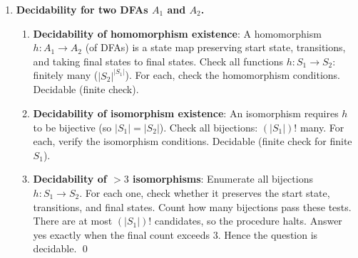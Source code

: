 \begin{enumerate}[{12.}1. ]
\begin{enumerate}
\item \textbf{Exists accepted string with all paths leading to final states}:
This asks whether there is a reachable subset $Q$ of $A^d$ such that
\[
Q\neq\emptyset,\qquad Q\subseteq F.
\]
Then $x$ is accepted (because $Q$ is nonempty and every element is final), and
every complete path on $x$ ends in a final state.

\item \textbf{All accepted strings have all complete paths to final states}:
This fails exactly when some reachable subset $Q$ of $A^d$ satisfies
\[
Q\cap F\neq\emptyset
\qquad\text{and}\qquad
Q-F\neq\emptyset.
\]
So the property is decidable by checking whether such a reachable subset exists.

\item \textbf{All strings have unique paths}: Construct a finite product machine
whose states record two simultaneous computations of $A$ on the same input,
together with a bit indicating whether the two computations have diverged. Then
there exists a string with two distinct complete paths iff a state with
``diverged = yes'' is reachable in this product machine. Hence uniqueness of
paths is decidable.
\end{enumerate}

\item \textbf{Decidability for two DFAs $A_1$ and $A_2$.}

\begin{enumerate}
\item \textbf{Decidability of homomorphism existence}: A homomorphism $h: A_1\to A_2$ (of DFAs) is a state map preserving start state, transitions, and taking final states to final states. Check all functions $h: S_1\to S_2$: finitely many ($|S_2|^{|S_1|}$). For each, check the homomorphism conditions. Decidable (finite check).

\item \textbf{Decidability of isomorphism existence}: An isomorphism requires $h$ to be bijective (so $|S_1|=|S_2|$). Check all bijections: $(|S_1|)!$ many. For each, verify the isomorphism conditions. Decidable (finite check for finite $S_1$).

\item \textbf{Decidability of $>3$ isomorphisms}: Enumerate all bijections
$h:S_1\to S_2$. For each one, check whether it preserves the start state,
transitions, and final states. Count how many bijections pass these tests.
There are at most $(|S_1|)!$ candidates, so the procedure halts. Answer yes
exactly when the final count exceeds $3$. Hence the question is decidable. \qed
\end{enumerate}


\end{enumerate}
